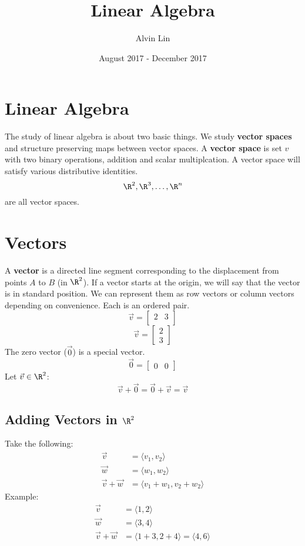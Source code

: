 \documentclass[letterpaper, 12pt]{math}
\title{Linear Algebra}
\author{Alvin Lin}
\date{August 2017 - December 2017}
\begin{document}
\maketitle

\section*{Linear Algebra}
The study of linear algebra is about two basic things. We study
\textbf{vector spaces} and structure preserving maps between vector
spaces. A \textbf{vector space} is set \( v \) with two binary operations,
addition and scalar multiplcation. A vector space will satisfy various
distributive identities.
\[ \R^2, \R^3, \dots, \R^n \]
are all vector spaces.

\section*{Vectors}
A \textbf{vector} is a directed line segment corresponding to the displacement
from points \( A \) to \( B \) (in \( \R^2 \)). If a vector starts at the
origin, we will say that the vector is in standard position. We can represent
them as row vectors or column vectors depending on convenience. Each is an
ordered pair.
\[ \vec{v} =
  \begin{bmatrix}
    2 & 3 \\
  \end{bmatrix} \]
\[ \vec{v} =
  \begin{bmatrix}
    2 \\
    3
  \end{bmatrix}
\]
The zero vector (\( \vec{0} \)) is a special vector.
\[ \vec{0} =
  \begin{bmatrix}
    0 & 0
  \end{bmatrix}
\]
Let \( \vec{v}\in\R^2 \):
\[ \vec{v}+\vec{0}=\vec{0}+\vec{v}=\vec{v} \]

\subsection*{Adding Vectors in \( \R^2 \)}
Take the following:
\begin{align*}
  \vec{v} &= \langle v_1,v_2\rangle \\
  \vec{w} &= \langle w_1,w_2\rangle \\
  \vec{v}+\vec{w} &= \langle v_1+w_1,v_2+w_2\rangle
\end{align*}
Example:
\begin{align*}
  \vec{v} &= \langle1,2\rangle \\
  \vec{w} &= \langle3,4\rangle \\
  \vec{v}+\vec{w} &= \langle1+3,2+4\rangle = \langle4,6\rangle
\end{align*}
\end{document}
